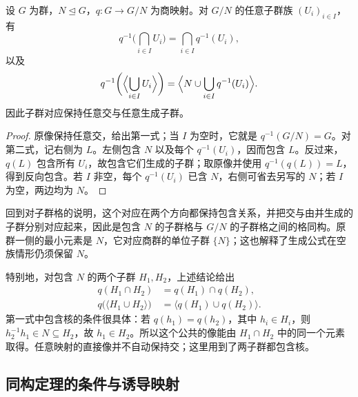 \begin{corollary}[交与生成的对应]\label{b1:cor:subgroup-correspondence-lattice}
	设 \(G\) 为群，\(N\trianglelefteq G\)，\(q:G\rightarrow G/N\) 为商映射。对 \(G/N\) 的任意子群族 \((U_i)_{i\in I}\)，有
	\[
		q^{-1}\biggl(\bigcap_{i\in I}U_i\biggr) =\bigcap_{i\in I}q^{-1}(U_i),
	\]
	以及
	\[
		q^{-1}\biggl(\Bigl\langle\bigcup_{i\in I}U_i\Bigr\rangle\biggr) =\Bigl\langle N\cup\bigcup_{i\in I}q^{-1}(U_i)\Bigr\rangle.
	\]
	因此子群对应保持任意交与任意生成子群。
\end{corollary}

\begin{proof}
	原像保持任意交，给出第一式；当 \(I\) 为空时，它就是 \(q^{-1}(G/N)=G\)。对第二式，记右侧为 \(L\)。左侧包含 \(N\) 以及每个 \(q^{-1}(U_i)\)，因而包含 \(L\)。反过来，\(q(L)\) 包含所有 \(U_i\)，故包含它们生成的子群；取原像并使用 \(q^{-1}(q(L))=L\)，得到反向包含。若 \(I\) 非空，每个 \(q^{-1}(U_i)\) 已含 \(N\)，右侧可省去另写的 \(N\)；若 \(I\) 为空，两边均为 \(N\)。
\end{proof}

回到对子群格的说明，这个对应在两个方向都保持包含关系，并把交与由并生成的子群分别对应起来，因此是包含 \(N\) 的子群格与 \(G/N\) 的子群格之间的格同构。原群一侧的最小元素是 \(N\)，它对应商群的单位子群 \(\{N\}\)；这也解释了生成公式在空族情形仍须保留 \(N\)。

\ProseParagraphBreak
特别地，对包含 \(N\) 的两个子群 \(H_1,H_2\)，上述结论给出
\[
	\begin{aligned}
		q(H_1\cap H_2)&=q(H_1)\cap q(H_2),\\
		q\bigl(\langle H_1\cup H_2\rangle\bigr) &=\bigl\langle q(H_1)\cup q(H_2)\bigr\rangle.
	\end{aligned}
\]
第一式中包含核的条件很具体：若 \(q(h_1)=q(h_2)\)，其中 \(h_i\in H_i\)，则 \(h_2^{-1}h_1\in N\subseteq H_2\)，故 \(h_1\in H_2\)。所以这个公共的像能由 \(H_1\cap H_2\) 中的同一个元素取得。任意映射的直接像并不自动保持交；这里用到了两子群都包含核。

\subsection{同构定理的条件与诱导映射}
\label{b1:subsec:0204:03}

